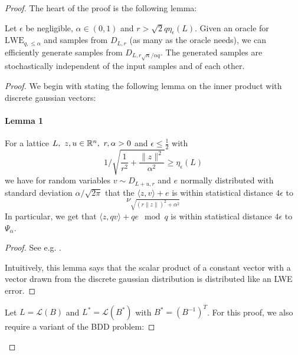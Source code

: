 \begin{proof}
The heart of the proof is the following lemma:

\label{recursive_step}
Let $\epsilon$ be negligible, $\alpha \in (0, 1)$ and $r > \sqrt{2}q\eta_\epsilon(L)$. Given an oracle for $\mathrm{LWE}_{q, \leq \alpha}$ and samples from $D_{L, r}$ (as many as the oracle needs), we can efficiently generate samples from $D_{L, r\sqrt{n}/\alpha q}$. The generated samples are stochastically independent of the input samples and of each other.

\begin{proof}
We begin with stating the following lemma on the inner product with discrete gaussian vectors:
\paragraph{Lemma 1}
For a lattice $L,\ z, u \in \mathbb{R}^n,\ r, \alpha > 0$ and $\epsilon \leq \frac 1 2$ with 
\begin{equation}
1 / \sqrt{\frac 1 {r^2} + \frac {\| z \|^2} {\alpha^2}} \geq \eta_{\epsilon}(L) \nonumber
\end{equation}
we have for random variables $v \sim D_{L + u, r}$ and $e$ normally distributed with standard deviation $\alpha/\sqrt{2\pi}$ that the $\langle z, v \rangle + e$ is within statistical distance $4\epsilon$ to
\begin{equation}
\nu_{\sqrt{(r\| z \|)^2 + \alpha^2}} \nonumber
\end{equation}
In particular, we get that $\langle z, qv \rangle + qe \mod q$ is within statistical distance $4\epsilon$ to $\Psi_\alpha$.

\begin{proof} \noqed See e.g. \cite[3.10]{Reg}. 
    
    Intuitively, this lemma says that the scalar product of a constant vector with a vector drawn from the discrete gaussian distribution is distributed like an LWE error.
\end{proof}

Let $L = \mathcal{L}(B)$ and $L^* = \mathcal{L}(B^*)$ with $B^* = \left(B^{-1}\right)^T$. For this proof, we also require a variant of the BDD problem:

\end{proof}
\end{proof}
